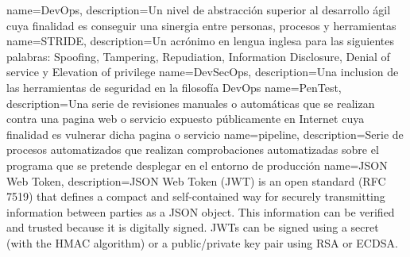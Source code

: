 {
        name=DevOps,
        description={Un nivel de abstracción superior al desarrollo ágil cuya
        finalidad es conseguir una sinergia entre personas, procesos y
        herramientas}
}
{
        name=STRIDE,
        description={Un acrónimo en lengua inglesa para las siguientes palabras:
        Spoofing, Tampering, Repudiation, Information Disclosure, Denial of
        service y Elevation of privilege}
}
{
        name=DevSecOps,
        description={Una inclusion de las herramientas de seguridad en la
        filosofía DevOps}
}
{
        name=PenTest,
        description={Una serie de revisiones manuales o automáticas que se
        realizan contra una pagina web o servicio expuesto públicamente en
        Internet cuya
        finalidad es vulnerar dicha pagina o servicio}
}
{
        name=pipeline,
        description={Serie de procesos automatizados que realizan comprobaciones
        automatizadas sobre el programa que se pretende desplegar en el entorno
        de producción}
}
{
        name=JSON Web Token,
        description={JSON Web Token (JWT) is an open standard (RFC 7519) that
        defines a compact and self-contained way for securely transmitting
        information between parties as a JSON object. This information can be
        verified and trusted because it is digitally signed. JWTs can be signed
        using a secret (with the HMAC algorithm) or a public/private key pair
        using RSA or ECDSA.}
}

